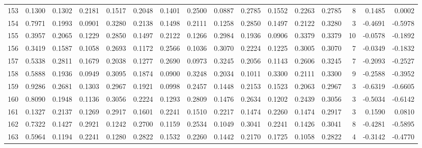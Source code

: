 \begin{tabular}{lrrrrrrrrrrrrrrr}
153 &      0.1300 &  0.1302 &  0.2181 &  0.1517 &  0.2048 &  0.1401 &  0.2500 &  0.0887 &  0.2785 &  0.1552 &   0.2263 &     0.2785 &      8 &                    0.1485 &                     0.0002 \\
154 &      0.7971 &  0.1993 &  0.0901 &  0.3280 &  0.2138 &  0.1498 &  0.2111 &  0.1258 &  0.2850 &  0.1497 &   0.2122 &     0.3280 &      3 &                   -0.4691 &                    -0.5978 \\
155 &      0.3957 &  0.2065 &  0.1229 &  0.2850 &  0.1497 &  0.2122 &  0.1266 &  0.2984 &  0.1936 &  0.0906 &   0.3379 &     0.3379 &     10 &                   -0.0578 &                    -0.1892 \\
156 &      0.3419 &  0.1587 &  0.1058 &  0.2693 &  0.1172 &  0.2566 &  0.1036 &  0.3070 &  0.2224 &  0.1225 &   0.3005 &     0.3070 &      7 &                   -0.0349 &                    -0.1832 \\
157 &      0.5338 &  0.2811 &  0.1679 &  0.2038 &  0.1277 &  0.2690 &  0.0973 &  0.3245 &  0.2056 &  0.1143 &   0.2606 &     0.3245 &      7 &                   -0.2093 &                    -0.2527 \\
158 &      0.5888 &  0.1936 &  0.0949 &  0.3095 &  0.1874 &  0.0900 &  0.3248 &  0.2034 &  0.1011 &  0.3300 &   0.2111 &     0.3300 &      9 &                   -0.2588 &                    -0.3952 \\
159 &      0.9286 &  0.2681 &  0.1303 &  0.2967 &  0.1921 &  0.0998 &  0.2457 &  0.1448 &  0.2153 &  0.1523 &   0.2063 &     0.2967 &      3 &                   -0.6319 &                    -0.6605 \\
160 &      0.8090 &  0.1948 &  0.1136 &  0.3056 &  0.2224 &  0.1293 &  0.2809 &  0.1476 &  0.2634 &  0.1202 &   0.2439 &     0.3056 &      3 &                   -0.5034 &                    -0.6142 \\
161 &      0.1327 &  0.2137 &  0.1269 &  0.2917 &  0.1601 &  0.2241 &  0.1510 &  0.2217 &  0.1474 &  0.2260 &   0.1474 &     0.2917 &      3 &                    0.1590 &                     0.0810 \\
162 &      0.7322 &  0.1427 &  0.2921 &  0.1242 &  0.2700 &  0.1159 &  0.2534 &  0.1049 &  0.3041 &  0.2241 &   0.1426 &     0.3041 &      8 &                   -0.4281 &                    -0.5895 \\
163 &      0.5964 &  0.1194 &  0.2241 &  0.1280 &  0.2822 &  0.1532 &  0.2260 &  0.1442 &  0.2170 &  0.1725 &   0.1058 &     0.2822 &      4 &                   -0.3142 &                    -0.4770 \\

\end{tabular}
